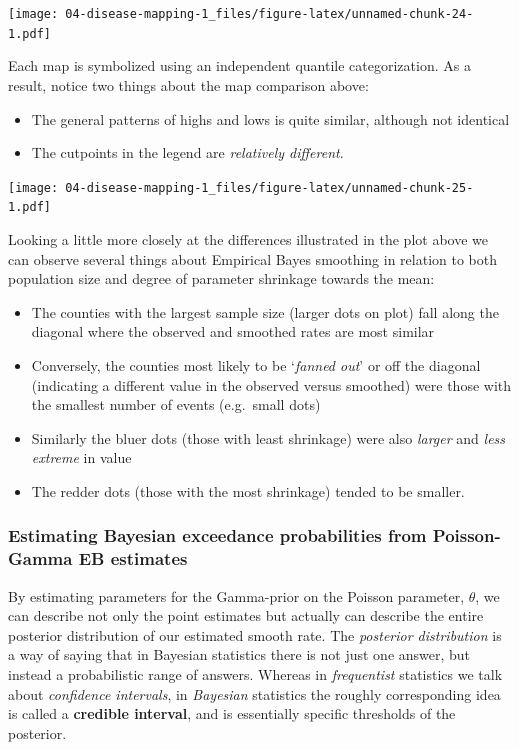 \documentclass[
]{book}
\providecommand{\tightlist}{%
  \setlength{\itemsep}{0pt}\setlength{\parskip}{0pt}}
\begin{document}
\texttt{[image: 04-disease-mapping-1\_files/figure-latex/unnamed-chunk-24-1.pdf]}

Each map is symbolized using an independent quantile categorization. As a result, notice two things about the map comparison above:

\begin{itemize}
\tightlist
\item
  The general patterns of highs and lows is quite similar, although not identical
\item
  The cutpoints in the legend are \emph{relatively different}.
\end{itemize}

\texttt{[image: 04-disease-mapping-1\_files/figure-latex/unnamed-chunk-25-1.pdf]}

Looking a little more closely at the differences illustrated in the plot above we can observe several things about Empirical Bayes smoothing in relation to both population size and degree of parameter shrinkage towards the mean:

\begin{itemize}
\tightlist
\item
  The counties with the largest sample size (larger dots on plot) fall along the diagonal where the observed and smoothed rates are most similar
\item
  Conversely, the counties most likely to be `\emph{fanned out}' or off the diagonal (indicating a different value in the observed versus smoothed) were those with the smallest number of events (e.g.~small dots)
\item
  Similarly the bluer dots (those with least shrinkage) were also \emph{larger} and \emph{less extreme} in value
\item
  The redder dots (those with the most shrinkage) tended to be smaller.
\end{itemize}

\hypertarget{estimating-bayesian-exceedance-probabilities-from-poisson-gamma-eb-estimates}{%
\subsubsection{Estimating Bayesian exceedance probabilities from Poisson-Gamma EB estimates}\label{estimating-bayesian-exceedance-probabilities-from-poisson-gamma-eb-estimates}}

By estimating parameters for the Gamma-prior on the Poisson parameter, \(\theta\), we can describe not only the point estimates but actually can describe the entire posterior distribution of our estimated smooth rate. The \emph{posterior distribution} is a way of saying that in Bayesian statistics there is not just one answer, but instead a probabilistic range of answers. Whereas in \emph{frequentist} statistics we talk about \emph{confidence intervals}, in \emph{Bayesian} statistics the roughly corresponding idea is called a \textbf{credible interval}, and is essentially specific thresholds of the posterior.
\end{document}
